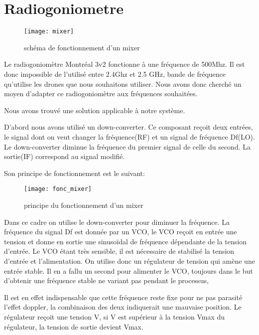 
\chapter{Radiogoniometre}


\begin{wrapfigure}{r}{0.4\textwidth}
  
  \texttt{[image: mixer]}
  \caption{schéma de fonctionnement d'un mixer}
\end{wrapfigure}


Le radiogoniomètre Montréal 3v2 fonctionne à une fréquence de 500Mhz. Il est donc impossible de l’utilisé entre 2.4Ghz et 2.5 GHz, bande de fréquence qu’utilise les drones que nous souhaitons utiliser. Nous avons donc cherché un moyen d’adapter ce radiogoniomètre aux fréquences souhaitées.


Nous avons trouvé une solution applicable à notre système.

D’abord nous avons utilisé un down-converter. Ce composant reçoit deux entrées, le signal dont on veut changer la fréquence(RF) et un signal de fréquence Df(LO). Le down-converter diminue la fréquence du premier signal de celle du second. La sortie(IF) correspond au signal modifié.

Son principe de fonctionnement est le suivant:



\begin{figure}[h]
  \centering
  \texttt{[image: fonc\_mixer]}
  \caption{principe du fonctionnement d'un mixer}
  \label{fig:mix}
\end{figure}

Dans ce cadre on utilise le down-converter pour diminuer la fréquence.
La fréquence du signal Df est donnée par un VCO, le VCO reçoit en entrée une tension et donne en sortie une sinusoïdal de fréquence dépendante de la tension d’entrée. Le VCO étant très sensible, il est nécessaire de stabilisé la tension d’entrée et l’alimentation. On utilise donc un régulateur de tension qui amène une entrée stable. Il en a fallu un second pour alimenter le VCO, toujours dans le but d’obtenir une fréquence stable ne variant pas pendant le processus, 

Il est en effet indispensable que cette fréquence reste fixe pour ne pas parasité l’effet doppler, la combinaison des deux indiquerait une mauvaise position.
Le régulateur reçoit une tension V, si V est supérieur à la tension Vmax du régulateur, la tension de sortie devient Vmax. 


